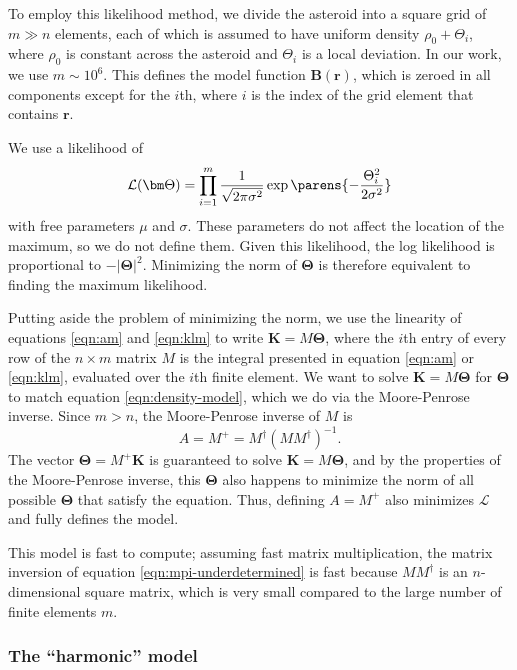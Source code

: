 To employ this likelihood method, we divide the asteroid into a square grid of $m \gg n$ elements, each of which is assumed to have uniform density $\rho_0+\Theta_i$, where $\rho_0$ is constant across the asteroid and $\Theta_i$ is a local deviation. In our work, we use $m \sim 10^{6}$. This defines the model function $\bm B(\bm r)$, which is zeroed in all components except for the $i$th, where $i$ is the index of the grid element that contains $\bm r$.

We use a likelihood of 
\begin{equation}
  \mathcal{L}(\bm \Theta) = \prod_{i=1}^m \frac{1}{\sqrt{2\pi \sigma^2}} \exp\parens{-\frac{\Theta_i^2}{2 \sigma^2}}
\end{equation}
with free parameters $\mu$ and $\sigma$. These parameters do not affect the location of the maximum, so we do not define them. Given this likelihood, the log likelihood is proportional to $-|\bm \Theta|^2$. Minimizing the norm of $\bm \Theta$ is therefore equivalent to finding the maximum likelihood.

Putting aside the problem of minimizing the norm, we use the linearity of equations \ref{eqn:am} and \ref{eqn:klm} to write $\bm K = M \bm \Theta$, where the $i$th entry of every row of the $n\times m$ matrix $M$ is the integral presented in equation \ref{eqn:am} or \ref{eqn:klm}, evaluated over the $i$th finite element. We want to solve $\bm K = M \bm \Theta$ for $\bm \Theta$ to match equation \ref{eqn:density-model}, which we do via the Moore-Penrose inverse. Since $m>n$, the Moore-Penrose inverse of $M$ is
\begin{equation}
  A=M^+ = M^\dagger(MM^\dagger)^{-1}.
  \label{eqn:mpi-underdetermined}
\end{equation}
The vector $\bm \Theta=M^+\bm K$ is guaranteed to solve $\bm K = M \bm \Theta$, and by the properties of the Moore-Penrose inverse, this $\bm \Theta$ also happens to minimize the norm of all possible $\bm \Theta$ that satisfy the equation. Thus, defining $A=M^+$ also minimizes $\mathcal{L}$ and fully defines the model.

This model is fast to compute; assuming fast matrix multiplication, the matrix inversion of equation \ref{eqn:mpi-underdetermined} is fast because $MM^\dagger$ is an $n$-dimensional square matrix, which is very small compared to the large number of finite elements $m$.




\subsubsection{The ``harmonic'' model}
\label{sec:harmonic}

